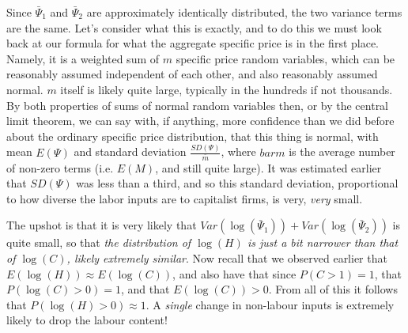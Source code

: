 \documentclass{article}
\theoremstyle{definition}
\theoremstyle{plain}
\theoremstyle{theorem}
\begin{document}
Since $\bar{\Psi}_1$ and $\bar{\Psi}_2$ are approximately identically distributed, the two variance terms are the same. Let's consider what this is exactly, and to do this we must look back at our formula for what the aggregate specific price is in the first place. Namely, it is a weighted sum of $m$ specific price random variables, which can be reasonably assumed independent of each other, and also reasonably assumed normal. $m$ itself is likely quite large, typically in the hundreds if not thousands. By both properties of sums of normal random variables then, or by the central limit theorem, we can say with, if anything, more confidence than we did before about the ordinary specific price distribution, that this thing is normal, with mean $E(\Psi)$ and standard deviation $\frac{SD(\Psi)}{\bar{m}}$, where $bar{m}$ is the average number of non-zero terms (i.e. $E(M)$, and still quite large). It was estimated earlier that $SD(\Psi)$ was less than a third, and so this standard deviation, proportional to how diverse the labor inputs are to capitalist firms, is very, \textit{very} small. \par 
The upshot is that it is very likely that $Var(\log(\bar{\Psi}_1)) + Var(\log(\bar{\Psi}_2))$ is quite small, so that \textit{the distribution of $\log(H)$ is just a bit narrower than that of $\log(C)$, likely extremely similar}. Now recall that we observed earlier that $E(\log(H)) \approx E(\log(C))$, and also have that since $P(C > 1) = 1$, that $P(\log(C) > 0) = 1$, and that $E(\log(C)) > 0$. From all of this it follows that $P(\log(H) > 0) \approx 1$. A \textit{single} change in non-labour inputs is extremely likely to drop the labour content! 
\end{document}
